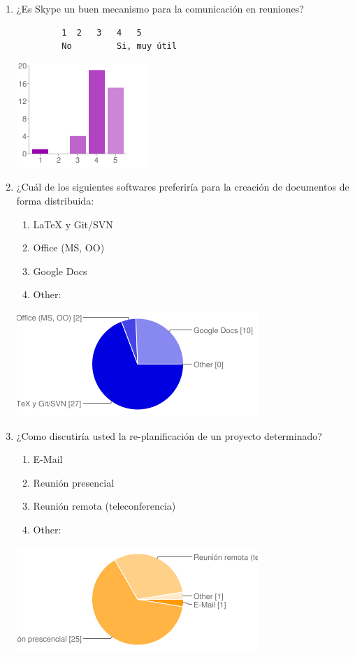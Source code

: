 \begin{enumerate}
	\item ¿Es Skype un buen mecanismo para la
		comunicación en reuniones? 
		\begin{verbatim}
         1	2	3	4	5
         No			Si, muy útil
		\end{verbatim}
        \begin{center}
        \includegraphics[scale=0.7]{images/encuesta2/12}
        \end{center}
	\item ¿Cuál de los siguientes softwares
		preferiría para la creación de documentos
		de forma distribuida:
		\begin{enumerate}
			\item LaTeX y Git/SVN
			\item Office (MS, OO)
			\item Google Docs
			\item Other: 
		\end{enumerate}
        \begin{center}
        \includegraphics[scale=0.7]{images/encuesta2/13}
        \end{center}
	\item ¿Como discutiría usted la re-planificación
		de un proyecto determinado?
		\begin{enumerate}
			\item E-Mail
			\item Reunión presencial
			\item Reunión remota (teleconferencia)
			\item Other: 
		\end{enumerate}
        \begin{center}
        \includegraphics[scale=0.7]{images/encuesta2/14}

\end{center}
\end{enumerate}
